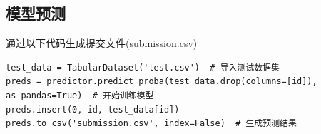 \documentclass[a4paper,UTF8]{article}
\theoremstyle{definition}
\begin{document}
\subsection{模型预测}
通过以下代码生成提交文件(submission.csv)
\begin{lstlisting}
test_data = TabularDataset('test.csv')  # 导入测试数据集
preds = predictor.predict_proba(test_data.drop(columns=[id]), as_pandas=True)  # 开始训练模型
preds.insert(0, id, test_data[id])
preds.to_csv('submission.csv', index=False)  # 生成预测结果
\end{lstlisting}
\end{document}
